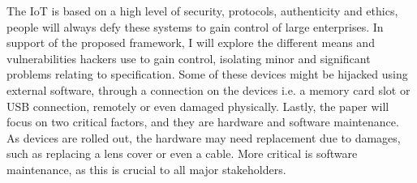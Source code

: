 \newline
\vspace{5mm} %
The IoT is based on a high level of security, protocols, authenticity and ethics, people will always defy these systems to gain control of large enterprises. In support of the proposed framework, I will explore the different means and vulnerabilities hackers use to gain control, isolating minor and significant problems relating to specification. Some of these devices might be hijacked using external software, through a connection on the devices i.e. a memory card slot or USB connection, remotely or even damaged physically. 
\newline
\vspace{5mm} %
Lastly, the paper will focus on two critical factors, and they are hardware and software maintenance. As devices are rolled out, the hardware may need replacement due to damages, such as replacing a lens cover or even a cable. More critical is software maintenance, as this is crucial to all major stakeholders. 
\newline
\vspace{5mm} %

